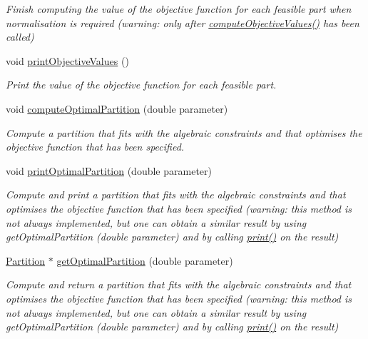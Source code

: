\begin{DoxyCompactItemize}
\begin{DoxyCompactList}\small\item\em Finish computing the value of the objective function for each feasible part when normalisation is required (warning\-: only after \hyperlink{classMultiSet_a3818a284a0b82daef5daec126bbc402b}{compute\-Objective\-Values()} has been called) \end{DoxyCompactList}\item 
\hypertarget{classMultiSet_a3b42f5d74bd694d2da9c291027d9de22}{void \hyperlink{classMultiSet_a3b42f5d74bd694d2da9c291027d9de22}{print\-Objective\-Values} ()}\label{classMultiSet_a3b42f5d74bd694d2da9c291027d9de22}

\begin{DoxyCompactList}\small\item\em Print the value of the objective function for each feasible part. \end{DoxyCompactList}\item 
void \hyperlink{classMultiSet_ac6dd8ba2c14844029e5ac13d40519305}{compute\-Optimal\-Partition} (double parameter)
\begin{DoxyCompactList}\small\item\em Compute a partition that fits with the algebraic constraints and that optimises the objective function that has been specified. \end{DoxyCompactList}\item 
void \hyperlink{classMultiSet_a5f8567d28993d4e5c6c314cc5dbca188}{print\-Optimal\-Partition} (double parameter)
\begin{DoxyCompactList}\small\item\em Compute and print a partition that fits with the algebraic constraints and that optimises the objective function that has been specified (warning\-: this method is not always implemented, but one can obtain a similar result by using get\-Optimal\-Partition (double parameter) and by calling \hyperlink{classMultiSet_ab08f0a90d249cecc0f7931caa2632f48}{print()} on the result) \end{DoxyCompactList}\item 
\hyperlink{classPartition}{Partition} $\ast$ \hyperlink{classMultiSet_a338a036d443609e814b8c8ff414cce7e}{get\-Optimal\-Partition} (double parameter)
\begin{DoxyCompactList}\small\item\em Compute and return a partition that fits with the algebraic constraints and that optimises the objective function that has been specified (warning\-: this method is not always implemented, but one can obtain a similar result by using get\-Optimal\-Partition (double parameter) and by calling \hyperlink{classMultiSet_ab08f0a90d249cecc0f7931caa2632f48}{print()} on the result) \end{DoxyCompactList}\end{DoxyCompactItemize}
